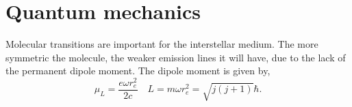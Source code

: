 \section*{Quantum mechanics}
Molecular transitions are important for the interstellar medium. The more symmetric the molecule, the weaker emission lines it will have, due to the lack of the permanent dipole moment. The dipole moment is given by,
\begin{equation}
  \mu_L = \frac{e\omega r_e^2}{2c} \quad L = m\omega r_e^2 = \sqrt{j(j+1)}\hbar. 
\end{equation}
